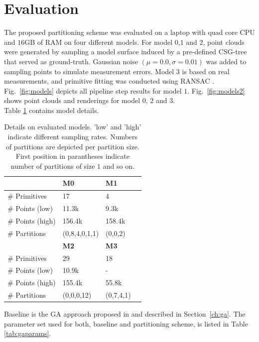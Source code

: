 \section{Evaluation}
\label{sec:eval}
The proposed partitioning scheme was evaluated on a laptop with quad core CPU and $16$GB of RAM on four different models.
For model $0$,$1$ and $2$, point clouds were generated by sampling a model surface induced by a pre-defined \ac{CSG}-tree that served as ground-truth. Gaussian noise $(\mu=0.0, \sigma=0.01)$ was added to sampling points to simulate measurement errors.
Model $3$ is based on real measurements, and primitive fitting was conducted using RANSAC \cite{schnabel2007efficient}.
Fig.~\ref{fig:models} depicts all pipeline step results for model $1$.
Fig.~\ref{fig:models2} shows point clouds and renderings for model $0$, $2$ and $3$.
\\
Table \ref{tab::models} contains model details. 
\begin{table}[h]
	\centering
	\begin{tabular}{|l|l|l|l|}
	\hline
	 & \textbf{M0} & \textbf{M1} \\
	\hline
	\# Primitives & 17 & 4  \\
	\hline
	\# Points (low) & 11.3k & 9.3k\\
	\hline
	\# Points (high) & 156.4k & 158.4k\\
	\hline
	\# Partitions & (0,8,4,0,1,1) & (0,0,2) \\
	\hline
	& \textbf{M2} & \textbf{M3} \\
	\hline
	\# Primitives & 29 & 18  \\
	\hline
	\# Points (low) & 10.9k & - \\
	\hline
	\# Points (high) & 155.4k & 55.8k \\
	\hline
	\# Partitions & (0,0,0,12) & (0,7,4,1) \\	
	\hline	
	\end{tabular}
	\caption{Details on evaluated models. 'low' and 'high' indicate different sampling rates. Numbers of partitions are depicted per partition size. First position in parantheses indicate number of partitions of size $1$ and so on.}
	\label{tab::models}
\end{table}
Baseline is the \ac{GA} approach proposed in \cite{fayolle2016evolutionary} and described in Section~\ref{ch:ga}. The parameter set used for both, baseline and partitioning scheme, is listed in Table \ref{tab:gaparams}.
